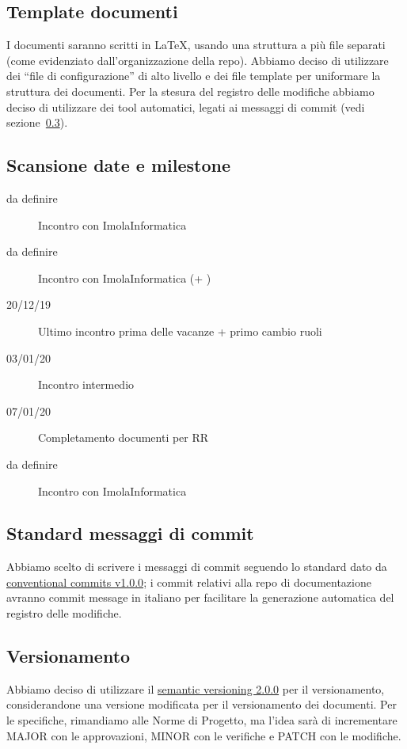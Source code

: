 \documentclass{article}
\begin{document}
\subsection{Template documenti}%
\label{sub:template_documenti}

I documenti saranno scritti in LaTeX, usando una struttura a più file separati (come evidenziato dall'organizzazione della repo).
Abbiamo deciso di utilizzare dei ``file di configurazione'' di alto livello e dei file template per uniformare la struttura dei documenti.
Per la stesura del registro delle modifiche abbiamo deciso di utilizzare dei tool automatici, legati ai messaggi di commit (vedi sezione~\ref{sub:standard_messaggi_di_commit}).

\subsection{Scansione date e milestone}%
\label{sub:scansione_date_e_milestone}

\begin{description}
  \item[da definire] Incontro con ImolaInformatica
  \item[da definire] Incontro con ImolaInformatica (+ \varepsilon)
  \item[20/12/19] Ultimo incontro prima delle vacanze + primo cambio ruoli
  \item[03/01/20] Incontro intermedio
  \item[07/01/20] Completamento documenti per RR
  \item[da definire] Incontro con ImolaInformatica
\end{description}

\subsection{Standard messaggi di commit}%
\label{sub:standard_messaggi_di_commit}

Abbiamo scelto di scrivere i messaggi di commit seguendo lo standard dato da \href{https://www.conventionalcommits.org/en/v1.0.0/}{conventional commits v1.0.0};
i commit relativi alla repo di documentazione avranno commit message in italiano per facilitare la generazione automatica del registro delle modifiche.

\subsection{Versionamento}%
\label{sub:versionamento}
Abbiamo deciso di utilizzare il \href{https://semver.org/}{semantic versioning 2.0.0} per il versionamento, considerandone una versione modificata per il versionamento dei documenti.
Per le specifiche, rimandiamo alle Norme di Progetto, ma l'idea sarà di incrementare MAJOR con le approvazioni, MINOR con le verifiche e PATCH con le modifiche.
\end{document}
